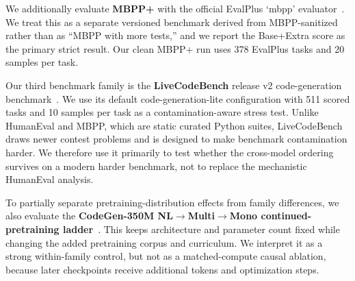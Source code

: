 \documentclass[preprint,12pt,authoryear]{elsarticle}
\begin{document}
We additionally evaluate \textbf{MBPP+} with the official EvalPlus `mbpp' evaluator~\cite{liu2023evalplus}. We treat this as a separate versioned benchmark derived from MBPP-sanitized rather than as ``MBPP with more tests,'' and we report the Base+Extra score as the primary strict result. Our clean MBPP+ run uses 378 EvalPlus tasks and 20 samples per task.

Our third benchmark family is the \textbf{LiveCodeBench} release v2 code-generation benchmark~\cite{jain2024livecodebench}. We use its default code-generation-lite configuration with 511 scored tasks and 10 samples per task as a contamination-aware stress test. Unlike HumanEval and MBPP, which are static curated Python suites, LiveCodeBench draws newer contest problems and is designed to make benchmark contamination harder. We therefore use it primarily to test whether the cross-model ordering survives on a modern harder benchmark, not to replace the mechanistic HumanEval analysis.

To partially separate pretraining-distribution effects from family differences, we also evaluate the \textbf{CodeGen-350M NL$\rightarrow$Multi$\rightarrow$Mono continued-pretraining ladder}~\cite{nijkamp2022codegen}. This keeps architecture and parameter count fixed while changing the added pretraining corpus and curriculum. We interpret it as a strong within-family control, but not as a matched-compute causal ablation, because later checkpoints receive additional tokens and optimization steps.

\begin{table}[t]
\centering
\caption{Experimental Scope by Benchmark Family}
\label{tab:scope}
\scriptsize
{}
\end{table}
\end{document}
